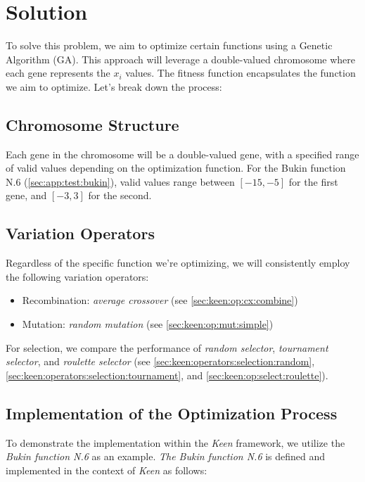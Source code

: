 \section{Solution}
\label{sec:fn_opt:sol}
  To solve this problem, we aim to optimize certain functions using a Genetic 
  Algorithm (GA). This approach will leverage a double-valued chromosome where 
  each gene represents the \(x_i\) values. The fitness function encapsulates 
  the function we aim to optimize. Let's break down the process:

  \subsection{Chromosome Structure}
    Each gene in the chromosome will be a double-valued gene, with a specified 
    range of valid values depending on the optimization function. For the Bukin 
    function N.6 (\vref{sec:app:test:bukin}), valid values range between 
    \([-15, -5]\) for the first gene, and \([-3, 3]\) for the second.

  \subsection{Variation Operators}
    Regardless of the specific function we're optimizing, we will consistently 
    employ the following variation operators:

    \begin{itemize}
      \item Recombination: \textit{average crossover} (see 
        \vref{sec:keen:op:cx:combine})
      \item Mutation: \textit{random mutation} (see 
        \vref{sec:keen:op:mut:simple})
    \end{itemize}

    For selection, we compare the performance of \textit{random selector}, 
    \textit{tournament selector}, and \textit{roulette selector} (see 
    \vref{sec:keen:operators:selection:random}, 
    \vref{sec:keen:operators:selection:tournament}, and 
    \vref{sec:keen:op:select:roulette}).

  \subsection{Implementation of the Optimization Process}
    To demonstrate the implementation within the \textit{Keen} framework, we 
    utilize the \textit{Bukin function N.6} as an example. \textit{The Bukin 
    function N.6} is defined and implemented in the context of \textit{Keen} as 
    follows:

